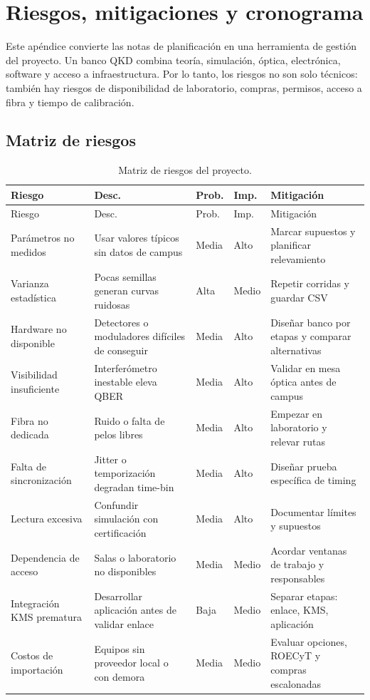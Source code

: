\chapter{Riesgos, mitigaciones y cronograma}
\label{app:riesgos}

Este apéndice convierte las notas de planificación en una herramienta de gestión del proyecto. Un banco QKD combina teoría, simulación, óptica, electrónica, software y acceso a infraestructura. Por lo tanto, los riesgos no son solo técnicos: también hay riesgos de disponibilidad de laboratorio, compras, permisos, acceso a fibra y tiempo de calibración.

\section{Matriz de riesgos}

\begin{longtable}{p{}p{}p{}p{}p{}}
  \caption{Matriz de riesgos del proyecto.}
  \label{tab:matriz_riesgos}\\
  \toprule
  Riesgo & Desc. & Prob. & Imp. & Mitigación \\
  \midrule
  \endfirsthead
  \toprule
  Riesgo & Desc. & Prob. & Imp. & Mitigación \\
  \midrule
  \endhead
  Parámetros no medidos & Usar valores típicos sin datos de campus & Media & Alto & Marcar supuestos y planificar relevamiento \\
  Varianza estadística & Pocas semillas generan curvas ruidosas & Alta & Medio & Repetir corridas y guardar CSV \\
  Hardware no disponible & Detectores o moduladores difíciles de conseguir & Media & Alto & Diseñar banco por etapas y comparar alternativas \\
  Visibilidad insuficiente & Interferómetro inestable eleva QBER & Media & Alto & Validar en mesa óptica antes de campus \\
  Fibra no dedicada & Ruido o falta de pelos libres & Media & Alto & Empezar en laboratorio y relevar rutas \\
  Falta de sincronización & Jitter o temporización degradan time-bin & Media & Alto & Diseñar prueba específica de timing \\
  Lectura excesiva & Confundir simulación con certificación & Media & Alto & Documentar límites y supuestos \\
  Dependencia de acceso & Salas o laboratorio no disponibles & Media & Medio & Acordar ventanas de trabajo y responsables \\
  Integración KMS prematura & Desarrollar aplicación antes de validar enlace & Baja & Medio & Separar etapas: enlace, KMS, aplicación \\
  Costos de importación & Equipos sin proveedor local o con demora & Media & Medio & Evaluar opciones, ROECyT y compras escalonadas \\
  \bottomrule
\end{longtable}

